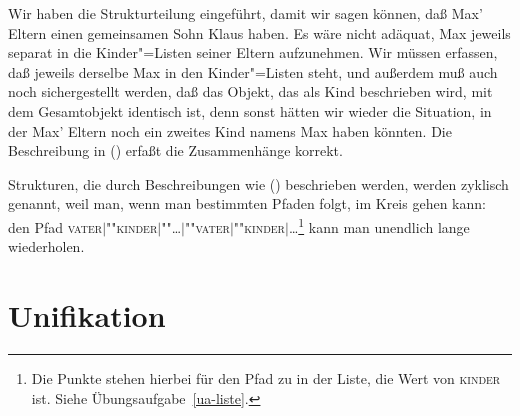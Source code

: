 Wir haben die Strukturteilung eingeführt, damit wir sagen können, daß
Max' Eltern einen gemeinsamen Sohn Klaus haben. Es wäre nicht adäquat,
Max jeweils separat in die Kinder"=Listen seiner Eltern aufzunehmen.
Wir müssen erfassen, daß jeweils derselbe Max in den Kinder"=Listen
steht, und außerdem muß auch noch sichergestellt werden, daß das
Objekt, das als Kind beschrieben wird, mit dem Gesamtobjekt identisch
ist, denn sonst hätten wir wieder die Situation, in der Max' Eltern
noch ein zweites Kind namens Max haben könnten.
Die Beschreibung in () erfaßt die Zusammenhänge korrekt.
\begin{figure}[htbp]
\ea
\label{bsp-avm-zyklen}
 
\z
\vspace{-\baselineskip}\end{figure}
Strukturen, die durch Beschreibungen wie () beschrieben werden, werden zyklisch genannt, weil man, wenn man bestimmten
Pfaden folgt, im Kreis gehen kann: \ZB den Pfad \textsc{vater$|$""kinder$|$""\ldots$|$""vater$|$""kinder$|$\ldots}\footnote{
  Die Punkte stehen hierbei für den Pfad zu  in der Liste, die
  Wert von \textsc{kinder} ist. Siehe Übungsaufgabe~\ref{ua-liste}.%
}
kann man unendlich lange wiederholen.

\section{Unifikation}
\label{sec-unifikation}

